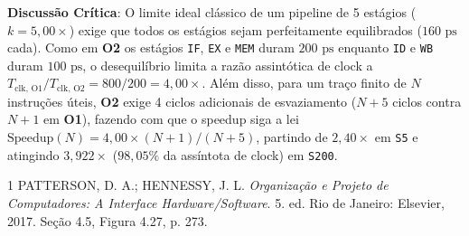 \documentclass[12pt]{article}
\begin{document}
\textbf{Discussão Crítica}: O limite ideal clássico de um pipeline de 5 estágios ($k = 5{,}00\times$) exige que todos os estágios sejam perfeitamente equilibrados ($160\text{ ps}$ cada). Como em \textbf{O2} os estágios \texttt{IF}, \texttt{EX} e \texttt{MEM} duram $200\text{ ps}$ enquanto \texttt{ID} e \texttt{WB} duram $100\text{ ps}$, o desequilíbrio limita a razão assintótica de clock a $T_{\text{clk, O1}}/T_{\text{clk, O2}} = 800/200 = 4{,}00\times$. Além disso, para um traço finito de $N$ instruções úteis, \textbf{O2} exige 4 ciclos adicionais de esvaziamento ($N+5$ ciclos contra $N+1$ em \textbf{O1}), fazendo com que o speedup siga a lei $\text{Speedup}(N) = 4{,}00 \times (N+1)/(N+5)$, partindo de $2{,}40\times$ em \texttt{S5} e atingindo $3{,}922\times$ ($98{,}05\%$ da assíntota de clock) em \texttt{S200}.

\begin{thebibliography}{1}
PATTERSON, D. A.; HENNESSY, J. L. \textit{Organização e Projeto de Computadores: A Interface Hardware/Software}. 5. ed. Rio de Janeiro: Elsevier, 2017. Seção 4.5, Figura 4.27, p. 273.
\end{thebibliography}
\end{document}
